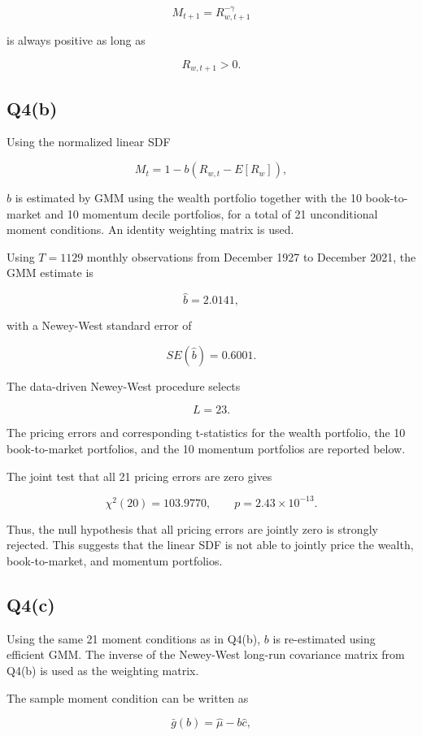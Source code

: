 \documentclass{article}
\begin{document}
\[
M_{t+1}
=
R_{w,t+1}^{-\gamma}
\]

is always positive as long as

\[
R_{w,t+1}>0.
\]


\subsection{Q4(b)}

Using the normalized linear SDF

\[
M_t
=
1-b\left(R_{w,t}-E[R_w]\right),
\]

\(b\) is estimated by GMM using the wealth portfolio together with the 10 book-to-market and 10 momentum decile portfolios, for a total of 21 unconditional moment conditions. An identity weighting matrix is used.

Using \(T=1129\) monthly observations from December 1927 to December 2021, the GMM estimate is

\[
\hat b=2.0141,
\]

with a Newey-West standard error of

\[
SE(\hat b)=0.6001.
\]

The data-driven Newey-West procedure selects

\[
L=23.
\]

The pricing errors and corresponding t-statistics for the wealth portfolio, the 10 book-to-market portfolios, and the 10 momentum portfolios are reported below.



The joint test that all 21 pricing errors are zero gives

\[
\chi^2(20)=103.9770,
\qquad
p=2.43\times10^{-13}.
\]

Thus, the null hypothesis that all pricing errors are jointly zero is strongly rejected. This suggests that the linear SDF is not able to jointly price the wealth, book-to-market, and momentum portfolios.


\subsection{Q4(c)}

Using the same 21 moment conditions as in Q4(b), \(b\) is re-estimated using efficient GMM. The inverse of the Newey-West long-run covariance matrix from Q4(b) is used as the weighting matrix.

The sample moment condition can be written as

\[
\bar g(b)
=
\hat\mu-b\hat c,
\]
\end{document}
